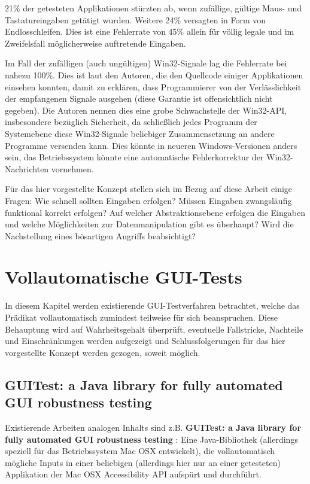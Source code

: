 21\% der getesteten Applikationen stürzten ab, wenn zufällige, gültige Maus- und Tastatureingaben 
getätigt wurden. Weitere 24\% versagten in Form von Endlosschleifen. Dies ist eine Fehlerrate von 45\%
allein für völlig legale und im Zweifelsfall möglicherweise auftretende Eingaben.

Im Fall der zufälligen (auch ungültigen) Win32-Signale lag die Fehlerrate bei nahezu 100\%. Dies ist
laut den Autoren, die den Quellcode einiger Applikationen einsehen konnten, damit zu erklären,
dass Programmierer von der Verlässlichkeit der empfangenen Signale ausgehen (diese Garantie ist offensichtlich
nicht gegeben). Die Autoren nennen dies eine grobe Schwachstelle der Win32-API, insbesondere bezüglich
Sicherheit, da schließlich jedes Programm der Systemebene diese Win32-Signale beliebiger Zusammensetzung
an andere Programme versenden kann. Dies könnte in neueren Windows-Versionen anders sein, das Betriebssystem
könnte eine automatische Fehlerkorrektur der Win32-Nachrichten vornehmen.

Für das hier vorgestellte Konzept stellen sich im Bezug auf diese Arbeit einige Fragen:
Wie schnell sollten Eingaben erfolgen? Müssen Eingaben zwangsläufig funktional korrekt erfolgen?
Auf welcher Abstraktionsebene erfolgen die Eingaben und welche Möglichkeiten zur Datenmanipulation
gibt es überhaupt? Wird die Nachstellung eines bösartigen Angriffs beabsichtigt?


\section{\glqq{}Vollautomatische\grqq{} GUI-Tests}\label{chapter:introfullautoguitesting}


In diesem Kapitel werden existierende GUI-Testverfahren betrachtet, welche das Prädikat
\glqq{}vollautomatisch\grqq{} zumindest teilweise für sich beanspruchen. Diese Behauptung wird
auf Wahrheitsgehalt überprüft, eventuelle Fallstricke, Nachteile und Einschränkungen werden aufgezeigt
und Schlussfolgerungen für das hier vorgestellte Konzept werden gezogen, soweit möglich.



\subsection{GUITest: a Java library for fully automated GUI robustness testing}

Existierende Arbeiten analogen Inhalts sind z.B. \textbf{\glqq{}GUITest: a Java library for fully automated
GUI robustness testing\grqq{}} \cite{GUITestBauersfeld}: Eine Java-Bibliothek 
(allerdings speziell für das Betriebssystem Mac OSX entwickelt), die
vollautomatisch mögliche Inputs in einer beliebigen (allerdings hier nur an einer getesteten)
Applikation der \glqq{}Mac OSX Accessibility API\grqq{} aufspürt und durchführt.

